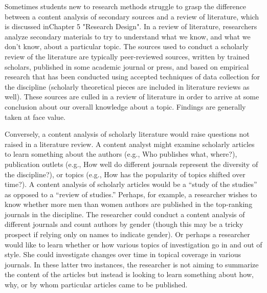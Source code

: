 Sometimes students new to research methods struggle to grasp the difference between a content analysis of secondary sources and a review of literature, which is discussed inChapter 5 "Research Design". In a review of literature, researchers analyze secondary materials to try to understand what we know, and what we don’t know, about a particular topic. The sources used to conduct a scholarly review of the literature are typically peer-reviewed sources, written by trained scholars, published in some academic journal or press, and based on empirical research that has been conducted using accepted techniques of data collection for the discipline (scholarly theoretical pieces are included in literature reviews as well). These sources are culled in a review of literature in order to arrive at some conclusion about our overall knowledge about a topic. Findings are generally taken at face value.

Conversely, a content analysis of scholarly literature would raise questions not raised in a literature review. A content analyst might examine scholarly articles to learn something about the authors (e.g., Who publishes what, where?), publication outlets (e.g., How well do different journals represent the diversity of the discipline?), or topics (e.g., How has the popularity of topics shifted over time?). A content analysis of scholarly articles would be a “study of the studies” as opposed to a “review of studies.” Perhaps, for example, a researcher wishes to know whether more men than women authors are published in the top-ranking journals in the discipline. The researcher could conduct a content analysis of different journals and count authors by gender (though this may be a tricky prospect if relying only on names to indicate gender). Or perhaps a researcher would like to learn whether or how various topics of investigation go in and out of style. She could investigate changes over time in topical coverage in various journals. In these latter two instances, the researcher is not aiming to summarize the content of the articles but instead is looking to learn something about how, why, or by whom particular articles came to be published.

